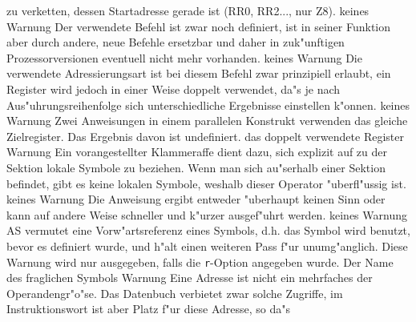 \documentclass[12pt,a4paper,twoside]{report}
\newcommand{\tty}[1]{{\tt #1}}
\newcommand{\asname}{AS}
\begin{document}
\begin{description}
{                zu verketten, dessen Startadresse gerade ist (RR0, RR2...,
                nur Z8).}
               {keines}
               {Warnung}
               {Der verwendete Befehl ist zwar noch
                definiert, ist in seiner Funktion aber durch andere,
                neue Befehle ersetzbar und daher in zuk"unftigen
                Prozessorversionen eventuell nicht mehr vorhanden.}
               {keines}
               {Warnung}
               {Die verwendete Adressierungsart ist bei
                diesem Befehl zwar prinzipiell erlaubt, ein Register
                wird jedoch in einer Weise doppelt verwendet, da"s je
                nach Aus"uhrungsreihenfolge sich unterschiedliche
                Ergebnisse einstellen k"onnen.}
               {keines}
               {Warnung}
               {Zwei Anweisungen in einem parallelen Konstrukt verwenden
                das gleiche Zielregister.  Das Ergebnis davon ist undefiniert.}
               {das doppelt verwendete Register}
               {Warnung}
               {Ein vorangestellter Klammeraffe dient
                dazu, sich explizit auf zu der Sektion lokale Symbole
                zu beziehen.  Wenn man sich au"serhalb einer Sektion
                befindet, gibt es keine lokalen Symbole, weshalb dieser
                Operator "uberfl"ussig ist.}
               {keines}
               {Warnung}
               {Die Anweisung ergibt entweder "uberhaupt
                keinen Sinn oder kann auf andere Weise schneller und k"urzer
                ausgef"uhrt werden.}
               {keines}
               {Warnung}
               {\asname{} vermutet eine Vorw"artsreferenz eines
                Symbols, d.h. das Symbol wird benutzt, bevor es definiert
                wurde, und h"alt einen weiteren Pass f"ur unumg"anglich.
                Diese Warnung wird nur ausgegeben, falls die \tty{r}-Option
                angegeben wurde.}
               {Der Name des fraglichen Symbols}
               {Warnung}
               {Eine Adresse ist nicht ein mehrfaches der
                Operandengr"o"se.  Das Datenbuch verbietet zwar solche Zugriffe,
                im Instruktionswort ist aber Platz f"ur diese Adresse, so da"s
}
\end{description}
\end{document}
